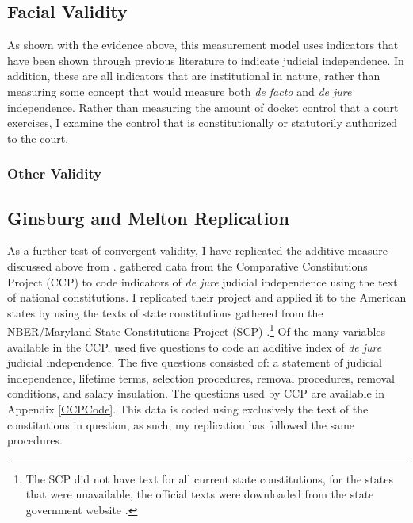 \documentclass[JohnsonMADraft2.tex]{subfiles}
\begin{document}
\subsection{Facial Validity}
As shown with the evidence above, this measurement model uses indicators that have been shown
through previous literature to indicate judicial independence. In addition, these are all indicators
that are institutional in nature, rather than measuring some concept that would measure both \textit{de facto} and \textit{de jure} independence. Rather than measuring the amount of docket control that a court
exercises, I examine the control that is constitutionally or statutorily authorized to the court.


\subsubsection{Other Validity}
\subsection*{Ginsburg and Melton Replication}
As a further test of convergent validity, I have replicated the additive measure discussed above from \citet{Melton2014}.  \citet{Melton2014} gathered data from the Comparative Constitutions Project (CCP) to code indicators of \textit{de jure} judicial independence using the text of national constitutions.  I replicated their project and applied it to the American states by using the texts of state constitutions gathered from the NBER/Maryland State Constitutions Project (SCP) \citep{Wallisnber}.\footnote{The SCP did not have text for all current state constitutions, for the states that were unavailable, the official texts were downloaded from the state government website \citep{Wallisnber}.}  Of the many variables available in the CCP, \citet{Melton2014} used five questions to code an additive index of \textit{de jure} judicial independence.  The five questions consisted of: a statement of judicial independence, lifetime terms, selection procedures, removal procedures, removal conditions, and salary insulation.  The questions used by CCP are available in Appendix \ref{CCPCode}.  This data is coded using exclusively the text of the constitutions in question, as such, my replication has followed the same procedures.

	
\end{document}
